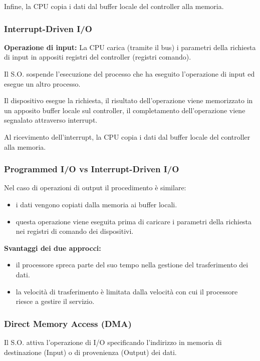 Infine, la CPU copia i dati dal buffer locale del controller alla memoria.

\subsubsection{Interrupt-Driven I/O}
\textbf{Operazione di input:}
\newline
La CPU carica (tramite il bus) i parametri della richiesta di input in appositi registri del controller (registri comando).

Il S.O. sospende l'esecuzione del processo che ha eseguito
l'operazione di input ed esegue un altro processo.

Il dispositivo esegue la richiesta, il risultato dell'operazione viene memorizzato in un apposito buffer locale sul controller, il completamento dell'operazione viene segnalato attraverso interrupt.

Al ricevimento dell'interrupt, la CPU copia i dati dal buffer locale del controller alla memoria.

\subsubsection{Programmed I/O vs Interrupt-Driven I/O}
Nel caso di operazioni di output il procedimento è similare:
\begin{itemize}
    \item i dati vengono copiati dalla memoria ai buffer locali.
    \item questa operazione viene eseguita prima di caricare i parametri della richiesta nei registri di comando dei dispositivi.
\end{itemize}

\textbf{Svantaggi dei due approcci:}
\begin{itemize}
    \item il processore spreca parte del suo tempo nella gestione del trasferimento dei dati.
    \item la velocità di trasferimento è limitata dalla velocità con cui il processore riesce a gestire il servizio.
\end{itemize}

\subsubsection{Direct Memory Access (DMA)}

Il S.O. attiva l'operazione di I/O specificando l'indirizzo in memoria di destinazione (Input) o di provenienza (Output) dei dati.

